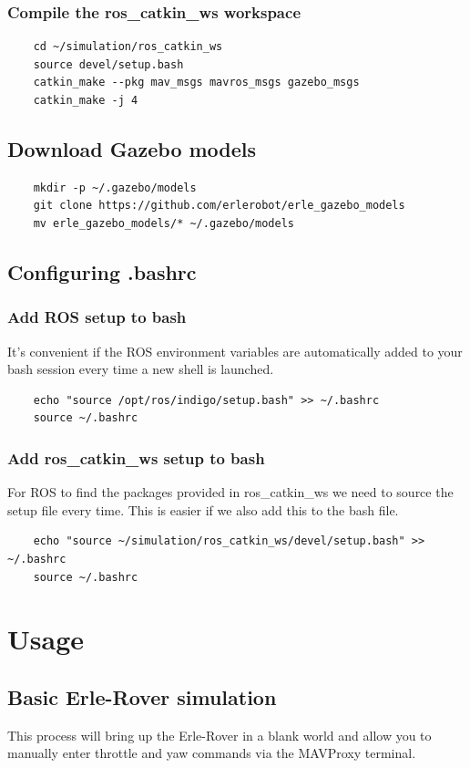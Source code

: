 \documentclass{report}
\begin{document}
\subsection{Compile the ros\_catkin\_ws workspace}
\begin{lstlisting}
	cd ~/simulation/ros_catkin_ws
	source devel/setup.bash
	catkin_make --pkg mav_msgs mavros_msgs gazebo_msgs
	catkin_make -j 4
\end{lstlisting}

\section{Download Gazebo models}
\begin{lstlisting}
	mkdir -p ~/.gazebo/models
	git clone https://github.com/erlerobot/erle_gazebo_models
	mv erle_gazebo_models/* ~/.gazebo/models
\end{lstlisting}

\section{Configuring .bashrc}
\subsection{Add ROS setup to bash}
	It's convenient if the ROS environment variables are automatically added to your bash session every time a new shell is launched.
\begin{lstlisting}
	echo "source /opt/ros/indigo/setup.bash" >> ~/.bashrc
	source ~/.bashrc
\end{lstlisting}

\subsection{Add ros\_catkin\_ws setup to bash}
	For ROS to find the packages provided in ros\_catkin\_ws we need to source the setup file every time. This is easier if we also add this to the bash file.
\begin{lstlisting}
	echo "source ~/simulation/ros_catkin_ws/devel/setup.bash" >> ~/.bashrc
	source ~/.bashrc
\end{lstlisting}


\chapter{Usage}
\section{Basic Erle-Rover simulation}
This process will bring up the Erle-Rover in a blank world and allow you to manually enter throttle and yaw commands via the MAVProxy terminal.
\end{document}
